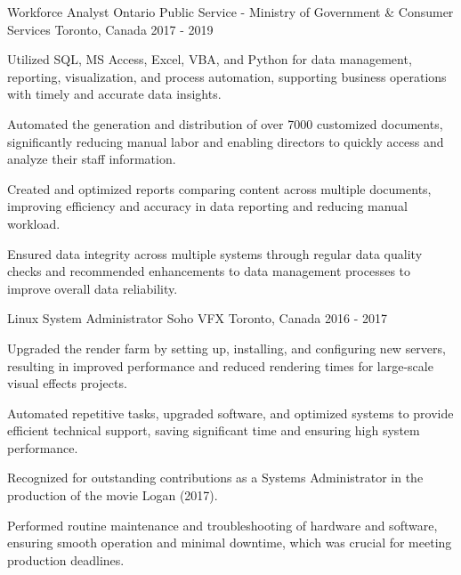 \begin{cventries}
\cventry
  {Workforce Analyst}
  {Ontario Public Service - Ministry of Government \& Consumer Services}
  {Toronto, Canada}
  {2017 - 2019}
  {
    \begin{cvitems}
      \item Utilized SQL, MS Access, Excel, VBA, and Python for data management, reporting, visualization, and process automation, supporting business operations with timely and accurate data insights.
      \item Automated the generation and distribution of over 7000 customized documents, significantly reducing manual labor and enabling directors to quickly access and analyze their staff information.
      \item Created and optimized reports comparing content across multiple documents, improving efficiency and accuracy in data reporting and reducing manual workload.
      \item Ensured data integrity across multiple systems through regular data quality checks and recommended enhancements to data management processes to improve overall data reliability.
    \end{cvitems}
  }

\cventry
  {Linux System Administrator}
  {Soho VFX}
  {Toronto, Canada}
  {2016 - 2017}
  {
    \begin{cvitems}
      \item Upgraded the render farm by setting up, installing, and configuring new servers, resulting in improved performance and reduced rendering times for large-scale visual effects projects.
      \item Automated repetitive tasks, upgraded software, and optimized systems to provide efficient technical support, saving significant time and ensuring high system performance.
      \item Recognized for outstanding contributions as a Systems Administrator in the production of the movie Logan (2017).
      \item Performed routine maintenance and troubleshooting of hardware and software, ensuring smooth operation and minimal downtime, which was crucial for meeting production deadlines.
    \end{cvitems}
  }
\end{cventries}
